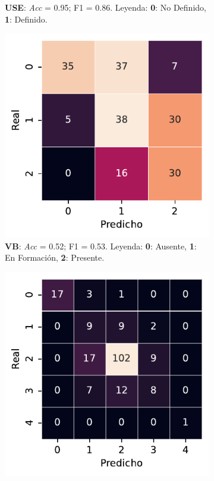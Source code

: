 \begin{figure}[htbp]
\begin{subfigure}[t]{0.3\textwidth}
        \caption{\textbf{USE}: \textit{Acc} = 0.95; F1 = 0.86. Leyenda: \textbf{0}: No Definido, \textbf{1}: Definido.}
        \label{fig5:USE_confusion_matrix}
    \end{subfigure}
    \begin{subfigure}[t]{0.3\textwidth}
        \includegraphics[width=\textwidth]{figures/5_experiments/single-vb-cm.pdf}
        \caption{\textbf{VB}: \textit{Acc} = 0.52; F1 = 0.53. Leyenda: \textbf{0}: Ausente, \textbf{1}: En Formación, \textbf{2}: Presente.}
        \label{fig5:VB_confusion_matrix}
    \end{subfigure}  
    \begin{subfigure}[t]{0.3\textwidth}
        \includegraphics[width=\textwidth]{figures/5_experiments/single-vm-cm.pdf}

\end{subfigure}
\end{figure}
